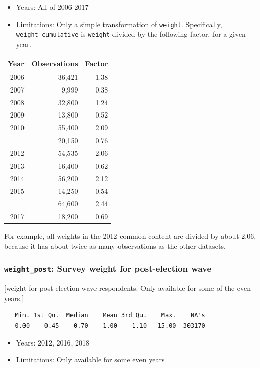 \documentclass[10pt,article,oneside]{memoir}
\theoremstyle{definition}
\begin{document}
\begin{itemize}
\tightlist
\item
  Years: All of 2006-2017
\item
  Limitations: Only a simple transformation of \texttt{weight}.
  Specifically, \texttt{weight\_cumulative} is \texttt{weight} divided
  by the following factor, for a given year.
\end{itemize}

\begin{tabular}{rrr}
\toprule
Year & Observations & Factor\\
\midrule
2006 & 36,421 & 1.38\\
2007 & 9,999 & 0.38\\
2008 & 32,800 & 1.24\\
2009 & 13,800 & 0.52\\
2010 & 55,400 & 2.09\\
\addlinespace
2011 & 20,150 & 0.76\\
2012 & 54,535 & 2.06\\
2013 & 16,400 & 0.62\\
2014 & 56,200 & 2.12\\
2015 & 14,250 & 0.54\\
\addlinespace
2016 & 64,600 & 2.44\\
2017 & 18,200 & 0.69\\
\bottomrule
\end{tabular}

For example, all weights in the 2012 common content are divided by about
2.06, because it has about twice as many observations as the other
datasets.

\hypertarget{weight_post-survey-weight-for-post-election-wave}{%
\subsubsection{\texorpdfstring{\texttt{weight\_post}: Survey weight for
post-election
wave}{weight\_post: Survey weight for post-election wave}}\label{weight_post-survey-weight-for-post-election-wave}}

{[}weight for post-election wave respondents. Only available for some of
the even years.{]}

\begin{verbatim}
   Min. 1st Qu.  Median    Mean 3rd Qu.    Max.    NA's 
   0.00    0.45    0.70    1.00    1.10   15.00  303170 
\end{verbatim}

\begin{itemize}
\tightlist
\item
  Years: 2012, 2016, 2018
\item
  Limitations: Only available for some even years.
\end{itemize}
\end{document}
